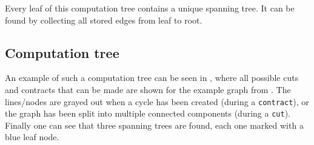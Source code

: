 Every leaf of this computation tree contains a unique spanning tree. It can be found by collecting all stored edges from leaf to root.\bigskip

\subsection{Computation tree}

An example of such a computation tree can be seen in , where all possible cuts and contracts that can be made are shown for the example graph from . The lines/nodes are grayed out when a cycle has been created (during a \texttt{contract}), or the graph has been split into multiple connected components (during a \texttt{cut}). Finally one can see that three spanning trees are found, each one marked with a blue leaf node.

